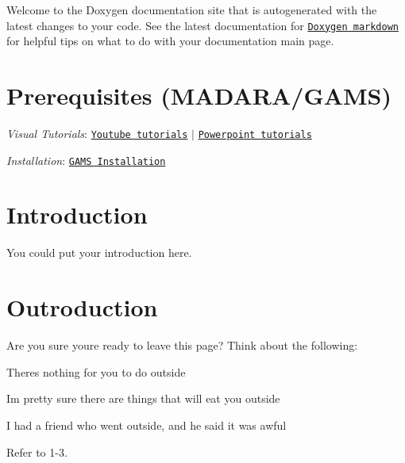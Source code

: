 Welcome to the Doxygen documentation site that is autogenerated with the latest changes to your code. See the latest documentation for \href{https://www.stack.nl/~dimitri/doxygen/manual/markdown.html}{\tt Doxygen markdown} for helpful tips on what to do with your documentation main page.



 \hypertarget{index_prereqs}{}\section{Prerequisites (\+M\+A\+D\+A\+R\+A/\+G\+A\+M\+S)}\label{index_prereqs}

\begin{DoxyItemize}
\item {\itshape Visual Tutorials}\+: \href{https://www.youtube.com/watch?v=Qvl3YriLMYI&list=PLSNlEg26NNpwi4ggcPYU8JvS1aVtV60_z}{\tt Youtube tutorials} $\vert$ \href{https://github.com/jredmondson/gams/wiki/Tutorial-Series-(C)}{\tt Powerpoint tutorials}
\item {\itshape Installation}\+: \href{https://github.com/jredmondson/gams/wiki/GAMS Installation}{\tt G\+A\+MS Installation}
\end{DoxyItemize}



 \hypertarget{index_intro}{}\section{Introduction}\label{index_intro}
You could put your introduction here.



 \hypertarget{index_outro}{}\section{Outroduction}\label{index_outro}
Are you sure you\textquotesingle{}re ready to leave this page? Think about the following\+:


\begin{DoxyEnumerate}
\item There\textquotesingle{}s nothing for you to do outside
\item I\textquotesingle{}m pretty sure there are things that will eat you outside
\item I had a friend who went outside, and he said it was awful
\item Refer to 1-\/3.
\end{DoxyEnumerate}



 